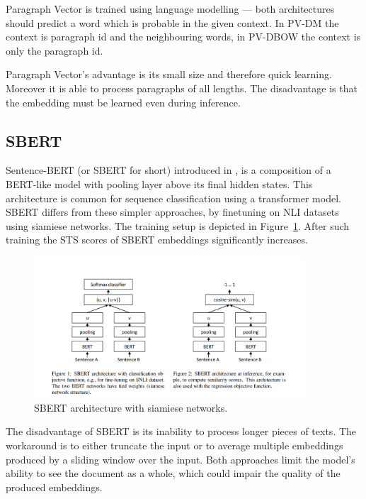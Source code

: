 Paragraph Vector is trained using language modelling --- both architectures should
predict a word which is probable in the given context. In PV-DM the context is
paragraph id and the neighbouring words, in PV-DBOW the context is only the
paragraph id.

Paragraph Vector's advantage is its small size and therefore quick learning.
Moreover it is able to process paragraphs of all lengths. The disadvantage is
that the embedding must be learned even during inference.

\subsection{SBERT}

Sentence-BERT (or SBERT for short) introduced in \cite{reimers2019sentence}, is
a composition of a BERT-like model with pooling layer above its final hidden
states. This architecture is common for sequence classification using a
transformer model. SBERT differs from these simpler approaches, by finetuning on
NLI datasets using siamiese networks. The training setup is depicted in
Figure~\ref{fig:sbert_siemese}. After such training the STS scores of SBERT
embeddings significantly increases.

\begin{figure}
    \centering
    \includegraphics[width=0.9\textwidth]{./img/sbert_pairs_architectures.png}
    \caption{SBERT architecture with siamiese
    networks.\label{fig:sbert_siemese}}
\end{figure}

The disadvantage of SBERT is its inability to process longer pieces of texts.
The workaround is to either truncate the input or to average multiple embeddings
produced by a sliding window over the input. Both approaches limit the model's
ability to see the document as a whole, which could impair the quality of the
produced embeddings.

